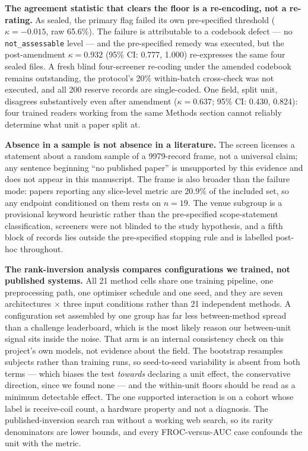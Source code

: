 \documentclass[11pt,a4paper]{article}
\begin{document}
\textbf{The agreement statistic that clears the floor is a re-encoding, not a
re-rating.} As sealed, the primary flag failed its own pre-specified threshold
($\kappa=-0.015$, raw 65.6\%). The failure is attributable to a codebook defect
--- no \texttt{not\_assessable} level --- and the pre-specified remedy was
executed, but the post-amendment $\kappa=0.932$ (95\% CI: 0.777, 1.000)
re-expresses the same four sealed files. A fresh blind four-screener re-coding
under the amended codebook remains outstanding, the protocol's 20\% within-batch
cross-check was not executed, and all 200 reserve records are single-coded. One
field, split unit, disagrees substantively even after amendment ($\kappa=0.637$;
95\% CI: 0.430, 0.824): four trained readers working from the same Methods
section cannot reliably determine what unit a paper split at.

\textbf{Absence in a sample is not absence in a literature.} The screen licenses
a statement about a random sample of a \num{9979}-record frame, not a universal
claim; any sentence beginning ``no published paper'' is unsupported by this
evidence and does not appear in this manuscript. The frame is also broader than
the failure mode: papers reporting any slice-level metric are 20.9\% of the
included set, so any endpoint conditioned on them rests on $n=19$. The venue
subgroup is a provisional keyword heuristic rather than the pre-specified
scope-statement classification, screeners were not blinded to the study
hypothesis, and a fifth block of records lies outside the pre-specified stopping
rule and is labelled post-hoc throughout.

\textbf{The rank-inversion analysis compares configurations we trained, not
published systems.} All 21 method cells share one training pipeline, one
preprocessing path, one optimiser schedule and one seed, and they are seven
architectures $\times$ three input conditions rather than 21 independent methods.
A configuration set assembled by one group has far less between-method spread
than a challenge leaderboard, which is the most likely reason our between-unit
signal sits inside the noise. That arm is an internal consistency check on this
project's own models, not evidence about the field. The bootstrap resamples
subjects rather than training runs, so seed-to-seed variability is absent from
both terms --- which biases the test \emph{towards} declaring a unit effect, the
conservative direction, since we found none --- and the within-unit floors should
be read as a minimum detectable effect. The one supported interaction is on a
cohort whose label is receive-coil count, a hardware property and not a
diagnosis. The published-inversion search ran without a working web search, so
its rarity denominators are lower bounds, and every FROC-versus-AUC case
confounds the unit with the metric.
\end{document}
